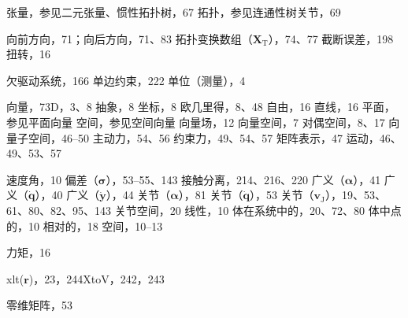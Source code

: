 \documentclass[10pt,a4paper]{book}
\theoremstyle{thmstyle} %
\theoremstyle{defstyle} %
\theoremstyle{prostyle} %
\begin{document}
张量，参见二元张量、惯性拓扑树，67 拓扑，参见连通性树关节，69



向前方向，71；向后方向，71、83 拓扑变换数组（$\mathbf{X}_{\mathrm{T}}$），74、77 截断误差，198 扭转，16



欠驱动系统，166 单边约束，222 单位（测量），4



向量，73D，3、8 抽象，8 坐标，8 欧几里得，8、48 自由，16 直线，16 平面，参见平面向量 空间，参见空间向量 向量场，12 向量空间，7 对偶空间，8、17 向量子空间，46–50 主动力，54、56 约束力，49、54、57 矩阵表示，47 运动，46、49、53、57



速度角，10 偏差（$\boldsymbol{\sigma}$），53–55、143 接触分离，214、216、220 广义（$\boldsymbol{\alpha}$），41 广义（$\dot{\boldsymbol{q}}$），40 广义（$\dot{\boldsymbol{y}}$），44 关节（$\boldsymbol{\alpha}$），81 关节（$\dot{\boldsymbol{q}}$），53 关节（$\boldsymbol{v}_{\mathrm{J}}$），19、53、61、80、82、95、143 关节空间，20 线性，10 体在系统中的，20、72、80 体中点的，10 相对的，18 空间，10–13



力矩，16



xlt($\boldsymbol{r}$)，23，244XtoV，242，243



零维矩阵，53
\end{document}
